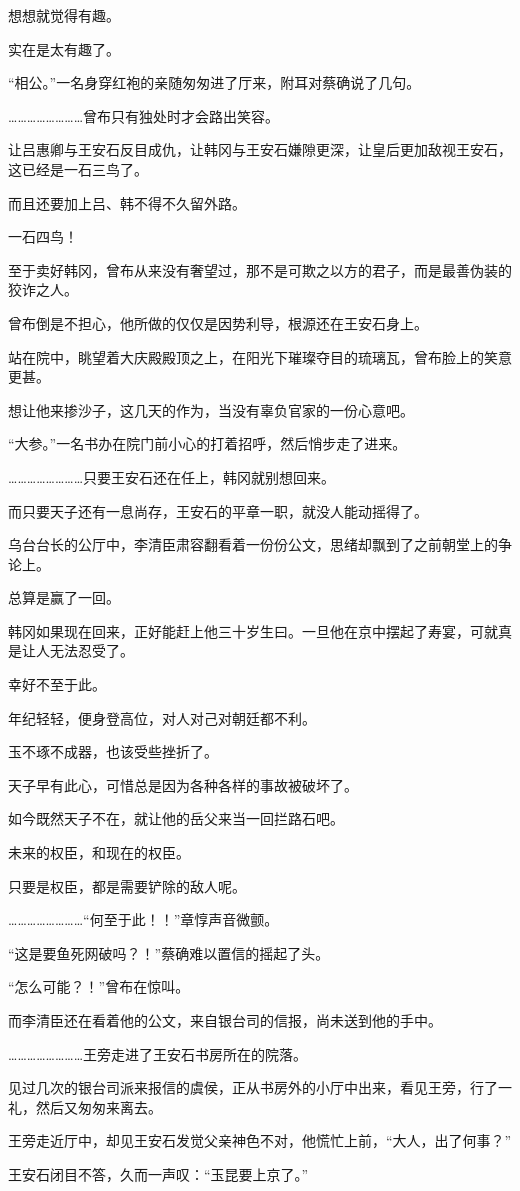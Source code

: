 想想就觉得有趣。

实在是太有趣了。

“相公。”一名身穿红袍的亲随匆匆进了厅来，附耳对蔡确说了几句。

……………………曾布只有独处时才会路出笑容。

让吕惠卿与王安石反目成仇，让韩冈与王安石嫌隙更深，让皇后更加敌视王安石，这已经是一石三鸟了。

而且还要加上吕、韩不得不久留外路。

一石四鸟！

至于卖好韩冈，曾布从来没有奢望过，那不是可欺之以方的君子，而是最善伪装的狡诈之人。

曾布倒是不担心，他所做的仅仅是因势利导，根源还在王安石身上。

站在院中，眺望着大庆殿殿顶之上，在阳光下璀璨夺目的琉璃瓦，曾布脸上的笑意更甚。

想让他来掺沙子，这几天的作为，当没有辜负官家的一份心意吧。

“大参。”一名书办在院门前小心的打着招呼，然后悄步走了进来。

……………………只要王安石还在任上，韩冈就别想回来。

而只要天子还有一息尚存，王安石的平章一职，就没人能动摇得了。

乌台台长的公厅中，李清臣肃容翻看着一份份公文，思绪却飘到了之前朝堂上的争论上。

总算是赢了一回。

韩冈如果现在回来，正好能赶上他三十岁生曰。一旦他在京中摆起了寿宴，可就真是让人无法忍受了。

幸好不至于此。

年纪轻轻，便身登高位，对人对己对朝廷都不利。

玉不琢不成器，也该受些挫折了。

天子早有此心，可惜总是因为各种各样的事故被破坏了。

如今既然天子不在，就让他的岳父来当一回拦路石吧。

未来的权臣，和现在的权臣。

只要是权臣，都是需要铲除的敌人呢。

……………………“何至于此！！”章惇声音微颤。

“这是要鱼死网破吗？！”蔡确难以置信的摇起了头。

“怎么可能？！”曾布在惊叫。

而李清臣还在看着他的公文，来自银台司的信报，尚未送到他的手中。

……………………王旁走进了王安石书房所在的院落。

见过几次的银台司派来报信的虞侯，正从书房外的小厅中出来，看见王旁，行了一礼，然后又匆匆来离去。

王旁走近厅中，却见王安石发觉父亲神色不对，他慌忙上前，“大人，出了何事？”

王安石闭目不答，久而一声叹：“玉昆要上京了。”
